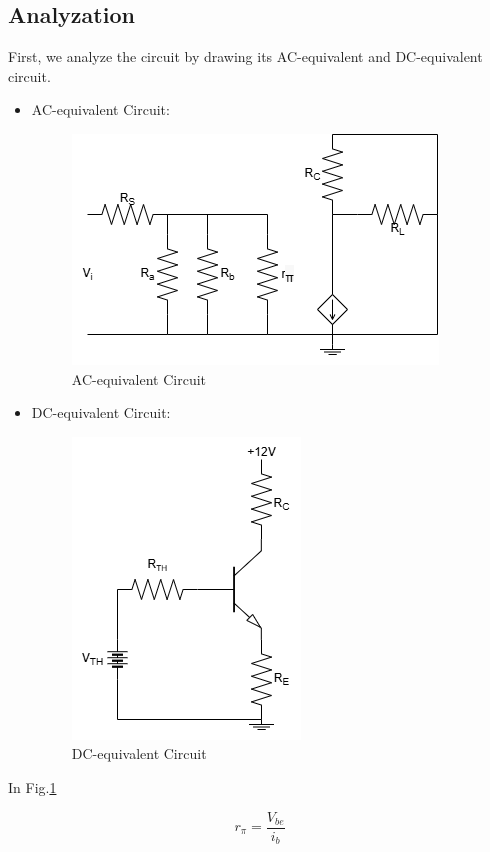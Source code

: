     \subsection{Analyzation}
    First, we analyze the circuit by drawing its AC-equivalent and DC-equivalent circuit.\par
    \begin{itemize}
        \item AC-equivalent Circuit:\par
            \begin{figure}[h]
                \centering
                \includegraphics[width=0.6\linewidth]{Lab06/Lab6ac.drawio.png}
                \caption{AC-equivalent Circuit}
                \label{l6ac}
            \end{figure}
            \FloatBarrier
        \item DC-equivalent Circuit:\par
            \begin{figure}[h]
                \centering
                \includegraphics[width=0.4\linewidth]{Lab06/Lab6dc.drawio.png}
                \caption{DC-equivalent Circuit}
                \label{l6dc}
            \end{figure}
            \FloatBarrier
    \end{itemize}
    In Fig.\ref{l6ac}\par
    \begin{equation}
            r_\pi=\frac{V_{be}}{i_b}
    \end{equation}
    
